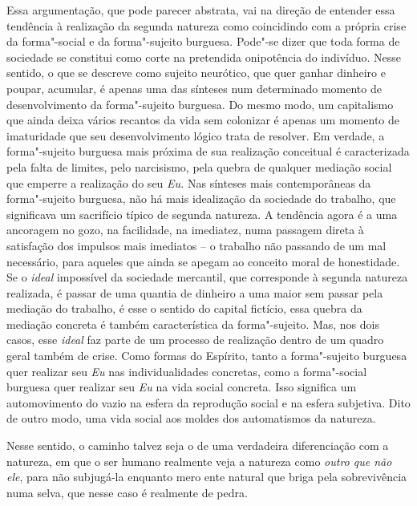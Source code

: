 {Essa argumentação, que pode parecer abstrata, vai na direção de entender
essa tendência à realização da segunda natureza como coincidindo com a
própria crise da forma"-social e da forma"-sujeito burguesa. Pode"-se dizer
que toda forma de sociedade se constitui como corte na pretendida
onipotência do indivíduo. Nesse sentido, o que se descreve como sujeito
neurótico, que quer ganhar dinheiro e poupar, acumular, é apenas uma das
sínteses num determinado momento de desenvolvimento da forma"-sujeito
burguesa. Do mesmo modo, um capitalismo que ainda deixa vários recantos
da vida sem colonizar é apenas um momento de imaturidade que seu
desenvolvimento lógico trata de resolver. Em verdade, a forma"-sujeito
burguesa mais próxima de sua realização conceitual é caracterizada pela
falta de limites, pelo narcisismo, pela quebra de qualquer mediação
social que emperre a realização do seu \emph{Eu.} Nas sínteses mais
contemporâneas da forma"-sujeito burguesa, não há mais idealização da
sociedade do trabalho, que significava um sacrifício típico de segunda
natureza. A tendência agora é a uma ancoragem no gozo, na facilidade, na
imediatez, numa passagem direta à satisfação dos impulsos mais imediatos
-- o trabalho não passando de um mal necessário, para aqueles que ainda
se apegam ao conceito moral de honestidade. Se o \emph{ideal} impossível
da sociedade mercantil, que corresponde à segunda natureza realizada, é
passar de uma quantia de dinheiro a uma maior sem passar pela mediação
do trabalho, é esse o sentido do capital fictício, essa quebra da
mediação concreta é também característica da forma"-sujeito. Mas, nos
dois casos, esse \emph{ideal} faz parte de um processo de realização
dentro de um quadro geral também de crise. Como formas do Espírito,
tanto a forma"-sujeito burguesa quer realizar seu \emph{Eu} nas
individualidades concretas, como a forma"-social burguesa quer realizar
seu \emph{Eu} na vida social concreta. Isso significa um automovimento
do vazio na esfera da reprodução social e na esfera subjetiva. Dito de
outro modo, uma vida social aos moldes dos automatismos da natureza.

Nesse sentido, o caminho talvez seja o de uma verdadeira diferenciação
com a natureza, em que o ser humano realmente veja a natureza como
\emph{outro que não ele}, para não subjugá-la enquanto mero ente natural
que briga pela sobrevivência numa selva, que nesse caso é realmente de
pedra.

}
